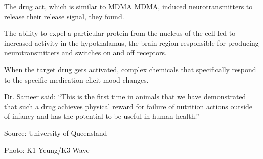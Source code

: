 \documentclass{article}
\begin{document}
The drug act, which is similar to MDMA MDMA, induced neurotransmitters to release their release signal, they found.

The ability to expel a particular protein from the nucleus of the cell led to increased activity in the hypothalamus, the brain region responsible for producing neurotransmitters and switches on and off receptors.

When the target drug gets activated, complex chemicals that specifically respond to the specific medication elicit mood changes.

Dr. Sameer said: “This is the first time in animals that we have demonstrated that such a drug achieves physical reward for failure of nutrition actions outside of infancy and has the potential to be useful in human health.”

Source: University of Queensland

Photo: K1 Yeung/K3 Wave
\end{document}
